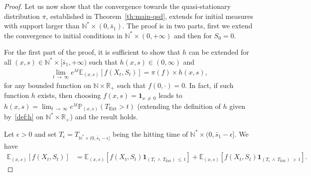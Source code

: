 \documentclass[AHL,Unicode,longabstracts,published]{cedram}
\newcommand{\PP}{\mathbb{P}}
\newcommand{\RR}{\mathbb{R}}
\newcommand{\NN}{\mathbb{N}}
\newcommand{\EE}{\mathbb{E}}
\newcommand{\X}{\NN^* \times (0,\bar s_1)}
\newcommand{\Text}{T_{\mathrm{Ext}}}
\newcommand{\1}{\mathbf{1}}
\begin{document}
\begin{proof}
Let us now show that the convergence towards the quasi-stationary distribution $\pi$, established in Theorem~\ref{th:main-qsd}, extends for initial measures with support larger than $\X$. The proof is in two parts, first we extend the convergence to initial conditions in $\NN^*\times (0,+\infty)$ and then for $S_0=0$.

For the first part of the proof, it is sufficient to show that $h$ can be extended for all $(x,s) \in \NN^* \times [\bar s_1,+\infty)$ such that $h(x,s)\in (0,\infty)$ and
\begin{align}\label{eq:cv.exp.lamt.exp}
\lim_{t\,\to\,\infty} e^{\lambda t} \EE_{(x,s)} [f(X_t,S_t)] = \pi(f) \times h(x,s),
\end{align}
for any bounded function on $\NN \times \RR_+$ such that $f(0,\cdot) =0$. In fact, if such function $h$ exists, then choosing $f(x,s)=\1_{x\,\neq\,0}$ leads to $h(x,s)= \lim_{t\,\to\,\infty} e^{\lambda t}\PP_{(x,s)} (\Text>t)$ (extending the definition of $h$ given by~\eqref{def:h} on $\NN^* \times \RR_+$) and the result holds.

Let $\epsilon>0$ and set $T_\epsilon=T_{ \NN^*\times (0,\bar s_1-\epsilon]}$ being the hitting time of $\NN^*\times (0,\bar s_1-\epsilon]$. We have
\begin{align*}
\EE_{(x,s)} \left[f(X_t,S_t)\right] &= \EE_{(x,s)} \left[f(X_t,S_t)\1_{\left(T_\epsilon\,\wedge\,\Text\right)\,\leq\,t}\right] + \EE_{(x,s)} \left[f(X_t,S_t)\1_{\left(T_\epsilon\,\wedge \,\Text\right)\,>\,t}\right].
\end{align*}


\end{proof}
\end{document}
